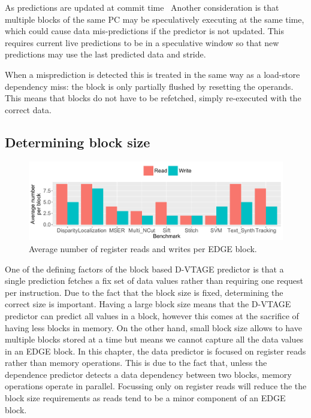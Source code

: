 As predictions are updated at commit time~\cite{paraisBeBop2015}
Another consideration is that multiple blocks of the same PC may be speculatively executing at the same time, which could cause data mis-predictions if the predictor is not updated.
This requires current live predictions to be in a speculative window so that new predictions may use the last predicted data and stride.

When a misprediction is detected this is treated in the same way as a load-store dependency miss: the block is only partially flushed by resetting the operands.
This means that blocks do not have to be refetched, simply re-executed with the correct data.

\subsection{Determining block size}
\begin{figure}[t]
    \centering
    \includegraphics[width=1\textwidth]{chapter3/graphics/averageRegRead.pdf}

    \caption{Average number of register reads and writes per EDGE block.}
    \label{fig:edge_reg_read}
	\vspace{1em}
\end{figure}
One of the defining factors of the block based D-VTAGE predictor is that a single prediction fetches a fix set of data values rather than requiring one request per instruction.
Due to the fact that the block size is fixed, determining the correct size is important.
Having a large block size means that the D-VTAGE predictor can predict all values in a block, however this comes at the sacrifice of having less blocks in memory.
On the other hand, small block size allows to have multiple blocks stored at a time but means we cannot capture all the data values in an EDGE block.
In this chapter, the data predictor is focused on register reads rather than memory operations.
This is due to the fact that, unless the dependence predictor detects a data dependency between two blocks, memory operations operate in parallel.
Focussing only on register reads will reduce the the block size requirements as reads tend to be a minor component of an EDGE block.

